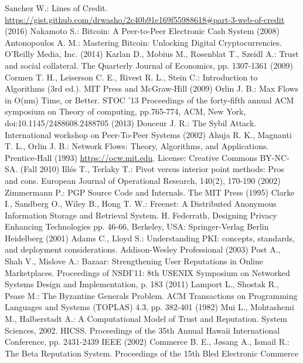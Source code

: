 \begin{thebibliography}{40}
  Sanchez W.: Lines of Credit. \url{https://gist.github.com/drwasho/2c40b91e169f55988618#part-3-web-of-credit} (2016)
  Nakamoto S.: Bitcoin: A Peer-to-Peer Electronic Cash System (2008)
  Antonopoulos A. M.: Mastering Bitcoin: Unlocking Digital Cryptocurrencies. O'Reilly Media, Inc. (2014)
  Karlan D., Mobius M., Rosenblat T., Szeidl A.: Trust and social collateral. The Quarterly Journal of Economics, pp.
  1307-1361 (2009)
  Cormen T. H., Leiserson C. E., Rivest R. L., Stein C.: Introduction to Algorithms (3rd ed.). MIT Press and McGraw-Hill
  (2009)
  Orlin J. B.: Max Flows in O(nm) Time, or Better. STOC '13 Proceedings of the forty-fifth annual ACM symposium on Theory
  of computing, pp.765-774, ACM, New York, doi:10.1145/2488608.2488705 (2013)
  Douceur J. R.: The Sybil Attack. International workshop on Peer-To-Peer Systems (2002)
  Ahuja R. K., Magnanti T. L., Orlin J. B.: Network Flows: Theory, Algorithms, and Applications. Prentice-Hall (1993)
  \url{https://ocw.mit.edu}. License: Creative Commons BY-NC-SA. (Fall 2010)
  Ill\'es T., Terlaky T.: Pivot versus interior point methods: Pros and cons. European Journal of Operational Research,
  140(2), 170-190 (2002)
  Zimmermann P.: PGP Source Code and Internals. The MIT Press (1995)
  Clarke I., Sandberg O., Wiley B., Hong T. W.: Freenet: A Distributed Anonymous Information Storage and
  Retrieval System. H. Federrath, Designing Privacy Enhancing Technologies pp. 46-66, Berkeley, USA: Springer-Verlag
  Berlin Heidelberg (2001)
  Adams C., Lloyd S.: Understanding PKI: concepts, standards, and deployment considerations. Addison-Wesley Professional
  (2003)
  Post A., Shah V., Mislove A.: Bazaar: Strengthening User Reputations in Online Marketplaces. Proceedings of NSDI'11:
  8th USENIX Symposium on Networked Systems Design and Implementation, p. 183 (2011)
  Lamport L., Shostak R., Pease M.: The Byzantine Generals Problem. ACM Transactions on Programming Languages and Systems
  (TOPLAS) 4.3, pp. 382-401 (1982)
  Mui L., Mohtashemi M., Halberstadt A.: A Computational Model of Trust and Reputation. System Sciences, 2002. HICSS.
  Proceedings of the 35th Annual Hawaii International Conference, pp. 2431-2439 IEEE (2002)
  Commerce B. E., J\o{}sang A., Ismail R.: The Beta Reputation System. Proceedings of the 15th Bled Electronic Commerce

\end{thebibliography}
